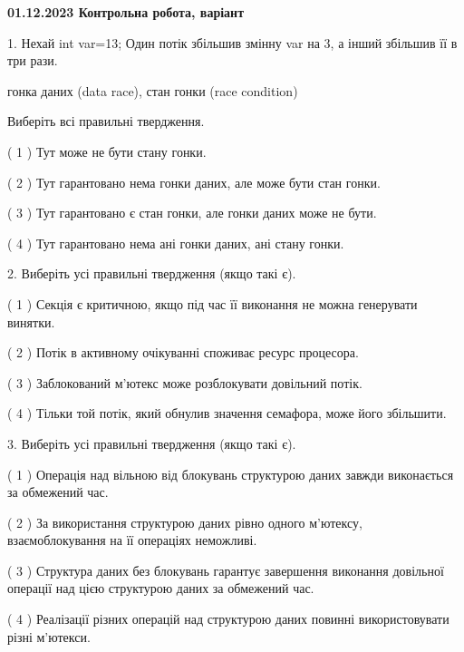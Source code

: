 \documentclass[12pt, ukrainian]{article}
\begin{document}
\vspace{4mm}
\newpage
\begin {large}

\textbf{01.12.2023 Контрольна робота, варіант  }\par


{
1. Нехай int var=13; Один потік збільшив змінну var на 3, а інший збільшив її в три рази.

гонка даних (data race), стан гонки (race condition)

Виберіть всі правильні твердження.\par
\vspace{2mm}
( 1 ) Тут може не бути стану гонки.%

( 2 ) Тут гарантовано нема гонки даних, але може бути стан гонки.%

( 3 ) Тут гарантовано є стан гонки, але гонки даних може не бути.%

( 4 ) Тут гарантовано нема ані гонки даних, ані стану гонки.%


\vspace{5mm}
2. Виберіть усі правильні твердження (якщо такі є).\par
\vspace{2mm}

( 1 ) Секція є критичною, якщо під час її виконання не можна генерувати винятки.%

( 2 ) Потік в активному очікуванні споживає ресурс процесора.%

( 3 ) Заблокований м’ютекс може розблокувати довільний потік.%

( 4 ) Тільки той потік, який обнулив значення семафора, може його збільшити.%


\vspace{5mm}
3. Виберіть усі правильні твердження (якщо такі є).\par
\vspace{2mm}

( 1 ) Операція над вільною від блокувань структурою даних завжди виконається за обмежений час.%

( 2 ) За використання структурою даних рівно одного м’ютексу, взаємоблокування на її операціях неможливі.%

( 3 ) Структура даних без блокувань гарантує завершення виконання довільної операції над цією структурою даних за обмежений час.%

( 4 ) Реалізації різних операцій над структурою даних повинні використовувати різні м’ютекси.%


}
\end{large}
\end{document}
